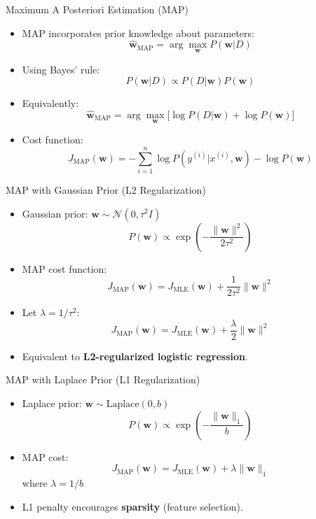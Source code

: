 \documentclass[serif, aspectratio=169]{beamer}
\begin{document}
\begin{frame}{Maximum A Posteriori Estimation (MAP)}
    \begin{itemize}
        \item MAP incorporates prior knowledge about parameters:
        \[
            \hat{\mathbf{w}}_{\text{MAP}} = \arg\max_{\mathbf{w}} P(\mathbf{w}|D)
        \]
        \item Using Bayes’ rule:
        \[
            P(\mathbf{w}|D) \propto P(D|\mathbf{w})P(\mathbf{w})
        \]
        \item Equivalently:
        \[
            \hat{\mathbf{w}}_{\text{MAP}} = \arg\max_{\mathbf{w}} \Big[ \log P(D|\mathbf{w}) + \log P(\mathbf{w}) \Big]
        \]
        \item Cost function:
        \[
            J_{\text{MAP}}(\mathbf{w}) = - \sum_{i=1}^n \log P(y^{(i)}|x^{(i)}, \mathbf{w}) - \log P(\mathbf{w})
        \]
    \end{itemize}
\end{frame}

\begin{frame}{MAP with Gaussian Prior (L2 Regularization)}
    \begin{itemize}
        \item Gaussian prior: $\mathbf{w} \sim \mathcal{N}(0, \tau^2 I)$
        \[
            P(\mathbf{w}) \propto \exp\left(-\frac{\|\mathbf{w}\|^2}{2\tau^2}\right)
        \]
        \item MAP cost function:
        \[
            J_{\text{MAP}}(\mathbf{w}) = J_{\text{MLE}}(\mathbf{w}) + \frac{1}{2\tau^2}\|\mathbf{w}\|^2
        \]
        \item Let $\lambda = 1/\tau^2$:
        \[
            J_{\text{MAP}}(\mathbf{w}) = J_{\text{MLE}}(\mathbf{w}) + \frac{\lambda}{2}\|\mathbf{w}\|^2
        \]
        \item Equivalent to \textbf{L2-regularized logistic regression}.
    \end{itemize}
\end{frame}

\begin{frame}{MAP with Laplace Prior (L1 Regularization)}
    \begin{itemize}
        \item Laplace prior: $\mathbf{w} \sim \text{Laplace}(0, b)$
        \[
            P(\mathbf{w}) \propto \exp\left(-\frac{\|\mathbf{w}\|_1}{b}\right)
        \]
        \item MAP cost:
        \[
            J_{\text{MAP}}(\mathbf{w}) = J_{\text{MLE}}(\mathbf{w}) + \lambda \|\mathbf{w}\|_1
        \]
        where $\lambda = 1/b$
        \item L1 penalty encourages \textbf{sparsity} (feature selection).
    \end{itemize}
\end{frame}
\end{document}
